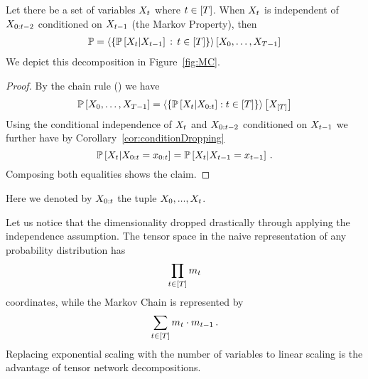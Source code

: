 \begin{theorem}\label{the:MarkovChain}
	Let there be a set of variables $X_{t}$ where $t\in[T]$.
	When $X_{t}$ is independent of $X_{0:{t-2}}$ conditioned on $X_{t-1}$ (the Markov Property), then
	\begin{align*}
		\mathbb{P} = \left\langle \{ \mathbb{P}\left[X_{t}|X_{t-1}\right]\, : \, t\in[T] \}\right\rangle \left[ 
		X_{0},\ldots,X_{T-1}
		 \right] 
	\end{align*}	
	We depict this decomposition in Figure~\ref{fig:MC}.
\end{theorem}
\begin{proof}
	By the chain rule () we have
	\begin{align*}
	 	\mathbb{P}\left[X_{0},\ldots,X_{T-1}\right]
		= \left\langle 
		\{ \mathbb{P}\left[X_{t}|X_{0:t}\right] : t\in[T] \}
		\right\rangle \left[ X_{[T]} \right]
	\end{align*}
	Using the conditional independence of $X_{t}$ and $X_{0:{t-2}}$ conditioned on $X_{t-1}$ we further have by Corollary~\ref{cor:conditionDropping}
		\[ \mathbb{P}\left[X_{t}|X_{0:t}=x_{0:t}\right]  = \mathbb{P}\left[X_{t}|X_{t-1}=x_{t-1}\right] \, .  \]
	Composing both equalities shows the claim.
\end{proof}

Here we denoted by $X_{0:t}$ the tuple $X_{0},...,X_{t}$.

\begin{remark}
	Let us notice that the dimensionality dropped drastically through applying the independence assumption.
	The tensor space in the naive representation of any probability distribution has
		\[ \prod_{t\in[T]} m_{t}\]
	coordinates, while the Markov Chain is represented by
		\[ \sum_{t\in[T]}  m_{t}\cdot m_{t-1} \, . \]
	Replacing exponential scaling with the number of variables to linear scaling is the advantage of tensor network decompositions.
\end{remark}

